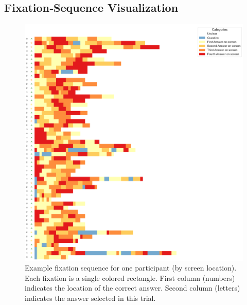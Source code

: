 \documentclass{article}
\begin{document}
\printbibliography


\newpage
\appendix
\begin{appendices}
    \section{Fixation‐Sequence Visualization}
    \label{app:fixseq}
    
    \begin{figure}[H]
      \centering
      \includegraphics[width=1\textwidth]{plots/random_p_by_loc.png}
      \caption{Example fixation sequence for one participant (by screen location). Each fixation is a single colored rectangle. First column (numbers) indicates the location of the correct answer. Second column (letters) indicates the answer selected in this trial.}
      \label{fig:fixseq1}
    \end{figure}
    

\end{appendices}
\end{document}
